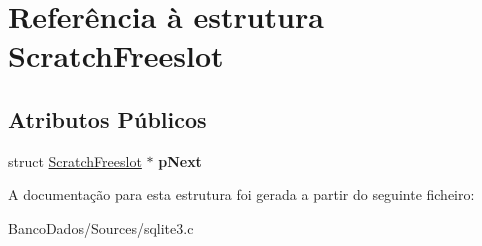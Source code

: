 \hypertarget{struct_scratch_freeslot}{\section{Referência à estrutura Scratch\-Freeslot}
\label{struct_scratch_freeslot}
}
\subsection*{Atributos Públicos}
\begin{DoxyCompactItemize}
\item 
\hypertarget{struct_scratch_freeslot_aca5c55a56a2a63a5be0756707a04bee8}{struct \hyperlink{struct_scratch_freeslot}{Scratch\-Freeslot} $\ast$ {\bfseries p\-Next}}\label{struct_scratch_freeslot_aca5c55a56a2a63a5be0756707a04bee8}

\end{DoxyCompactItemize}


A documentação para esta estrutura foi gerada a partir do seguinte ficheiro\-:\begin{DoxyCompactItemize}
\item 
Banco\-Dados/\-Sources/sqlite3.\-c\end{DoxyCompactItemize}
